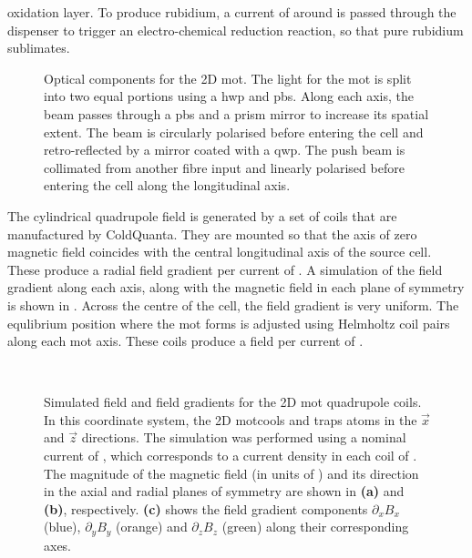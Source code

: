 oxidation layer. To produce rubidium, a current of around  is passed through the dispenser
to trigger an electro-chemical reduction reaction, so that pure rubidium sublimates.
\begin{figure}[!htbp]
	\centering
	\def\svgwidth{0.5\textwidth}
	
	\caption[Optical components for the 2D \ac{mot}]{Optical components for the 2D \ac{mot}. The light for the \ac{mot} is split into two equal portions using a \ac{hwp} and \ac{pbs}. Along each axis, the beam passes through a \ac{pbs} and a prism mirror to increase its spatial extent. The beam is circularly polarised before entering the cell and retro-reflected by a mirror coated with a \ac{qwp}. The push beam is collimated from another fibre input and linearly polarised before entering the cell along the longitudinal axis.}
	\label{fig:2D_mot_optics}
\end{figure}
\par\noindent The cylindrical quadrupole field is generated by a set of coils
that are manufactured by ColdQuanta. They are mounted so that the axis of
zero magnetic field coincides with the central longitudinal axis of the source
cell. These produce a radial field gradient per current of
. A simulation of the field
gradient along each axis, along with the magnetic field in each plane of
symmetry is shown in .  
Across the centre of the cell, the field gradient is very uniform. The equlibrium position where the \ac{ mot} forms is adjusted using Helmholtz coil pairs along each \ac{mot} axis. These coils produce a field per current of
.
\begin{figure}[!htbp]
	\centering
	\def\svgwidth{\columnwidth}
	\\
	\caption[Simulated field and field gradients for the 2D \ac{mot} quadrupole
		coils]{Simulated field and field gradients for the 2D \ac{mot}
		quadrupole coils. In this coordinate system, the 2D \ac{mot}cools and
		traps atoms in the \(\vec{x}\) and \(\vec{z}\) directions. The
		simulation was performed using a nominal current of
		, which corresponds to a current density in each
		coil of . The magnitude of
		the magnetic field (in units of \sivalue{}{\gauss}) and its direction in
		the axial and radial planes of symmetry are shown in \textbf{(a)} and
		\textbf{(b)}, respectively. \textbf{(c)} shows the field gradient
		components \(\partial_x B_x\) (blue), \(\partial_y B_y\) (orange) and
		\(\partial_z B_z\) (green) along their corresponding axes.}
	\label{fig:2d_mot_field_gradient}
\end{figure}

